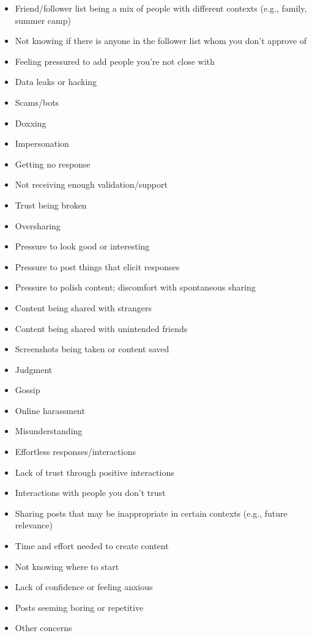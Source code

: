\begin{itemize}
    \item Friend/follower list being a mix of people with different contexts (e.g., family, summer camp)
    \item Not knowing if there is anyone in the follower list whom you don’t approve of
    \item Feeling pressured to add people you’re not close with
    \item Data leaks or hacking
    \item Scams/bots
    \item Doxxing
    \item Impersonation
    \item Getting no response
    \item Not receiving enough validation/support
    \item Trust being broken
    \item Oversharing
    \item Pressure to look good or interesting
    \item Pressure to post things that elicit responses
    \item Pressure to polish content; discomfort with spontaneous sharing
    \item Content being shared with strangers
    \item Content being shared with unintended friends
    \item Screenshots being taken or content saved
    \item Judgment
    \item Gossip
    \item Online harassment
    \item Misunderstanding
    \item Effortless responses/interactions
    \item Lack of trust through positive interactions
    \item Interactions with people you don’t trust
    \item Sharing posts that may be inappropriate in certain contexts (e.g., future relevance)
    \item Time and effort needed to create content
    \item Not knowing where to start
    \item Lack of confidence or feeling anxious
    \item Posts seeming boring or repetitive
    \item Other concerns
\end{itemize}

